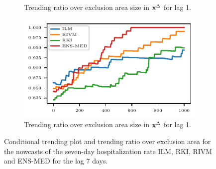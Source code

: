 \begin{figure}
\begin{subfigure}[t]{.48\textwidth}
    \caption{Trending ratio over exclusion area size in $\mathbf{x}^{\Delta}$ for lag 1.}\label{fig:app-covid-trending-ratio-1}
    \end{subfigure}\hfill
    \begin{subfigure}[t]{.48\textwidth}
    \includegraphics{plots/covid_nowcast/40_acc_eps_lag_14}
    \caption{Trending ratio over exclusion area size in $\mathbf{x}^{\Delta}$ for lag 1.}\label{fig:app-covid-trending-ratio-14}
    \end{subfigure}
    \caption{Conditional trending plot and trending ratio over exclusion area for the nowcasts of the seven-day hospitalization rate ILM, RKI, RIVM and ENS-MED for the lag 7 days.}
    \label{fig:app-covid-cond-prob-trending-ratio-1-14}
\end{figure}